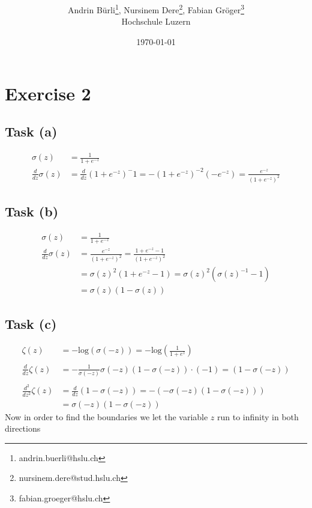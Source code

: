 \documentclass[onecolumn]{article}
\title{\spacecaps{Lab report: SW02}\\ \normalsize \spacesc{TSM\_DeLearn} }
\author{Andrin Bürli\thanks{andrin.buerli@hslu.ch}, Nursinem Dere\thanks{nursinem.dere@stud.hslu.ch}, Fabian Gröger\thanks{fabian.groeger@hslu.ch}\\Hochschule Luzern}
\date{\today}
\begin{document}
\maketitle

\section{Exercise 2}

\subsection{Task (a)}

\[
\begin{aligned}
	\sigma(z)&=\frac{1}{1+e^{-z}}\\
	\frac{d}{dz} \sigma(z) &= \frac{d}{dz}(1+e^{-z})^-1=-(1+e^{-z})^{-2}(-e^{-z})=\frac{e^{-z}}{(1+e^{-z})^{2}}
\end{aligned}
\]

\subsection{Task (b)}

\[
\begin{aligned}
	\sigma(z)&=\frac{1}{1+e^{-z}} \\
	\frac{d}{dz} \sigma(z) &= \frac{e^{-z}}{(1+e^{-z})^{2}}=\frac{1+e^{-z}-1}{(1+e^{-z})^{2}} \\
	&=\sigma(z)^2(1+e^{-z}-1)=\sigma(z)^2(\sigma(z)^{-1}-1) \\
	&=\sigma(z)(1-\sigma(z))
\end{aligned}
\]

\subsection{Task (c)}

\[
\begin{aligned}
	\zeta(z)&=-\text{log}(\sigma(-z))=-\text{log}\left(\frac{1}{1+e^z}\right)\\
	\\
	\frac{d}{dz} \zeta(z) &= -\frac{1}{\sigma(-z)} \sigma(-z)(1-\sigma(-z))\cdot (-1) = (1-\sigma(-z)) \\
	\\
	\frac{d^2}{dz^2} \zeta(z) &=\frac{d}{dz} (1-\sigma(-z))=-(-\sigma(-z)(1-\sigma(-z)))\\
	&=\sigma(-z)(1-\sigma(-z))
\end{aligned}
\]
Now in order to find the boundaries we let the variable $z$ run to infinity in both directions
\end{document}
